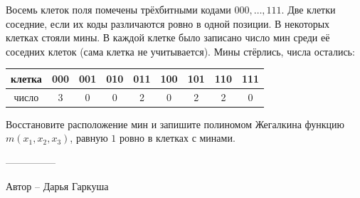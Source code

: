 \question
Восемь клеток поля помечены трёхбитными кодами $000,\dots,111$. Две клетки соседние, если их коды различаются ровно в одной позиции. В некоторых клетках стояли мины. В каждой клетке было записано число мин среди её соседних клеток (сама клетка не учитывается). Мины стёрлись, числа остались:
\begin{center}
\begin{tabular}{c|*{8}{c}}
клетка & 000 & 001 & 010 & 011 & 100 & 101 & 110 & 111 \\ \hline
число & 3 & 0 & 0 & 2 & 0 & 2 & 2 & 0
\end{tabular}
\end{center}
Восстановите расположение мин и запишите полиномом Жегалкина функцию $m(x_1,x_2,x_3)$, равную $1$ ровно в клетках с минами.

---------------

Автор -- Дарья Гаркуша